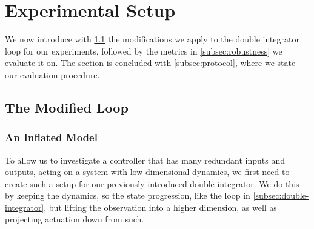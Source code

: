
\section{Experimental Setup}
\label{sec:setup}

We now introduce with \cref{subsec:modified-loop} the modifications we apply to the
double integrator loop for our experiments, followed by the metrics in \cref{subsec:robustness}
we evaluate it on. The section is concluded with \cref{subsec:protocol}, where we state
our evaluation procedure.

\subsection{The Modified Loop}
\label{subsec:modified-loop}

\subsubsection{An Inflated Model}
\label{subsubsec:inflated-model}

To allow us to investigate a controller that has many redundant inputs and outputs, acting on a
system with low-dimensional dynamics, we first need to create such a setup for our previously introduced
double integrator. We do this by keeping the dynamics, so the state progression, like the loop in \cref{subsec:double-integrator},
but lifting the observation into a higher dimension, as well as projecting actuation down from such.

